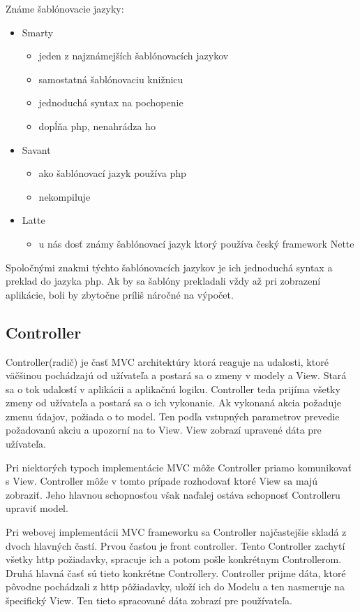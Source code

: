 \documentclass[12pt]{book}
\begin{document}
Známe šablónovacie jazyky:
\begin{itemize}
\item{Smarty}
\begin{itemize}
\item{jeden z najznámejších šablónovacích jazykov}
\item{samostatná šablónovaciu knižnicu}
\item{jednoduchá syntax na pochopenie}
\item{dopĺňa php, nenahrádza ho}
\end{itemize}
\item{Savant}
\begin{itemize}
\item{ako šablónovací jazyk používa php}
\item{nekompiluje}
\end{itemize}
\item{Latte}
\begin{itemize}
\item{u nás dosť známy šablónovací jazyk ktorý používa český framework Nette}
\end{itemize}
\end{itemize}
Spoločnými znakmi týchto šablónovacích jazykov je ich jednoduchá syntax a preklad do jazyka php. Ak by sa šablóny prekladali vždy až pri zobrazení aplikácie, boli by zbytočne príliš náročné na výpočet.

\subsection{Controller}
Controller(radič) je časť MVC architektúry ktorá reaguje na udalosti, ktoré väčšinou pochádzajú od užívateľa a postará sa o zmeny v modely a View.  Stará sa o tok udalostí v aplikácii a aplikačnú logiku. Controller teda prijíma všetky zmeny od užívateľa a postará sa o ich vykonanie. Ak vykonaná akcia požaduje zmenu údajov, požiada o to model. Ten podľa vstupných parametrov prevedie požadovanú akciu a upozorní na to View. View zobrazí upravené dáta pre užívateľa.

Pri niektorých typoch implementácie MVC môže Controller priamo komunikovať s View. Controller môže v tomto prípade rozhodovať ktoré View sa majú zobraziť. Jeho hlavnou schopnosťou však naďalej ostáva schopnosť Controlleru upraviť model.

Pri webovej implementácii MVC frameworku sa Controller najčastejšie skladá z dvoch hlavných častí. Prvou časťou je front controller. Tento Controller zachytí všetky http požiadavky, spracuje ich a potom pošle konkrétnym Controllerom. Druhá hlavná časť sú tieto konkrétne Controllery. Controller prijme dáta, ktoré pôvodne pochádzali z http pôžiadavky, uloží ich do Modelu a ten nasmeruje na špecifický View. Ten tieto spracované dáta zobrazí pre používateľa.
\end{document}
